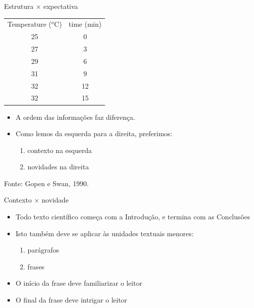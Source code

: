 \documentclass{beamer}
\begin{document}
\begin{frame}{Estrutura $\times$ expectativa}
  \begin{example}
    \begin{tabular}{cc}
      Temperature ($^o$C) & time (min) \\
      25 & 0 \\
      27 & 3 \\
      29 & 6\\
      31 & 9\\
      32 & 12\\
      32 & 15 \\
    \end{tabular}
  \end{example}
  \begin{itemize}
  \item A \alert{ordem} das informações faz diferença.
  \item Como lemos da esquerda para a direita, preferimos:
    \begin{enumerate}
    \item contexto na esquerda
    \item novidades na direita
    \end{enumerate}
  \end{itemize}

  \vfill
  Fonte: Gopen e Swan, 1990.
\end{frame}

\begin{frame}{Contexto $\times$ novidade}
  \begin{itemize}
  \item Todo texto científico começa com a Introdução, e termina com
    as Conclusões
  \item Isto também deve se aplicar às unidades textuais menores:
    \begin{enumerate}
    \item<2-> parágrafos
    \item<2-> frases
    \end{enumerate}
  \item O início da frase deve familiarizar o leitor
  \item O final da frase deve intrigar o leitor
  \end{itemize}
\end{frame}
\end{document}
